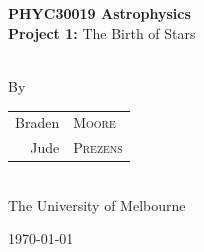 \documentclass[a4paper]{article} %
\begin{document}
\pagestyle{empty}

\newcommand{\HRule}{\rule{\linewidth}{0.5mm}}

\begin{titlepage}

    \begin{center}
        \textsc{}\\[3cm]

        \\[0.75cm]        
        \Huge \textbf{PHYC30019 Astrophysics}\\[0.5cm]
        \huge \textbf{Project 1:} The Birth of Stars\\[0.5cm] 
        \\[1.5cm]

        \begin{minipage}{0.5\textwidth}
        \begin{center}

		\vspace{3cm}
        \large By \\[0.75cm]
        \begin{tabular}{rl}
        \Large Braden &\Large \textsc{Moore} \\[0.1cm]
        \Large Jude & \Large \textsc{Prezens} \\    
		\end{tabular}  
		\\[1cm]
        \normalsize \normalfont 
        The University of Melbourne \\[2cm]

        \end{center}
        \end{minipage}

        \vfill

        \large \today
    \end{center}

\newpage
\end{titlepage}

\end{document}
